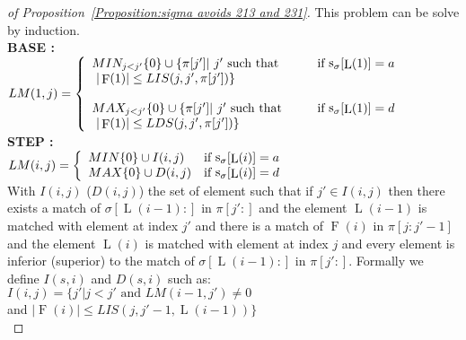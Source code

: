 \documentclass[a4paper]{llncs}
\newcommand{\ptext}{\pi}
\newcommand{\pmotif}{\sigma}
\DeclareMathOperator{\stripea}{s}
\newcommand{\stripe}[2]{\stripea_{{#1}}[{#2}]}
\newcommand{\dstep}{d}
\newcommand{\ustep}{a}
\DeclareMathOperator{\firsta}{L}
\newcommand{\first}[1]{\firsta({#1})}
\DeclareMathOperator{\factora}{F}
\newcommand{\factor}[1]{\factora({#1})}
\begin{document}
\begin{proof}[of Proposition~\ref{Proposition:sigma avoids 213 and 231}]
This problem can be solve by induction.\\
			
\textbf{BASE :} \\
$LM(1,j)= \left\{ 
	\begin{array}{l l}
	
		MIN_{j<j'}\{0\} \cup \{\ptext[j'] |\text{ $j'$ such that \indent } & 
		\text{if $\stripe{\pmotif}{\first{1}}=\ustep$}\\
		\text{ $|\factor{1}| \leq LIS(j,j',\ptext[j'])  $}\}&\\			
	
	
		&\\
		
		MAX_{j<j'}\{0\} \cup \{\ptext[j'] |\text{ $j'$ such that \indent } &
		\text{if $\stripe{\pmotif}{\first{1}}=\dstep$} \\
		\text{ $|\factor{1}| \leq LDS(j,j',\ptext[j']) $}\}&\\			
	
	\end{array} \right. $\\	

\textbf{STEP :} \\
$LM(i,j)= \left\{ 
	\begin{array}{l l}
	
		MIN \{0\} \cup  I(i,j) & 
		\text{if $\stripe{\pmotif}{\first{i}}=\ustep$}\\

		
		MAX \{0\} \cup  D(i,j) & 
		\text{if $\stripe{\pmotif}{\first{i}}=\dstep$}\\

		
							
	\end{array} \right. $\\
					
With $I(i,j)$ ($D(i,j)$) the set of element such that
if  $j' \in I(i,j)$ then there exists 
a match of $\pmotif[\first{i-1}:]$ in $\ptext[j':]$ and
the element $\first{i-1}$ is matched with element at index $j'$ and
there is a match of $\factor{i}$ in $\ptext[j:j'-1]$ and
the element $\first{i}$ is matched with element at index $j$ and every element is inferior (superior) to the match of  
$\pmotif[\first{i-1}:]$ in $\ptext[j':]$.
Formally we define $I(s,i)$ and $D(s,i)$ such as:\\
			
$I(i,j)=\{j'|\text{$j<j'$ and $LM(i-1,j')\neq 0$}$ \\
\indent \indent \indent and  $|\factor{i}| \leq LIS(j,j'-1,\first{i-1})\}$ \\


\end{proof}
\end{document}
